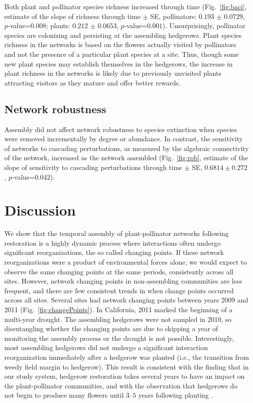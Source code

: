 \documentclass[12pt]{article}
\begin{document}
Both plant and pollinator species richness increased through time
(Fig.~\ref{fig:baci}, estimate of the slope of richness through time
$\pm$ SE, pollinators: $0.193$ $\pm$ $0.0729$, $p$-value=$0.008$;
plants: $0.212$ $\pm$ $0.0653$, $p$-value=$0.001$). Unsurprisingly,
pollinator species are colonizing and persisting at the assembling
hedgerows. Plant species richness in the networks is based on the
flowers actually visited by pollinators and not the presence of a
particular plant species at a site. Thus, though some new plant
species may establish themselves in the hedgerows, the increase in
plant richness in the networks is likely due to previously unvisited
plants attracting visitors as they mature and offer better rewards.

\subsection*{Network robustness}
Assembly did not affect network robustness to species
extinction when species were removed incrementally by
degree %
or abundance. %
In contrast, the sensitivity of networks to cascading perturbations,
as measured by the algebraic connectivity of the network, increased as
the network assembled (Fig.~\ref{fig:rob}, estimate of the slope of
sensitivity to cascading perturbations through time $\pm$ SE, $0.6814
\pm 0.272$, $p$-value=$0.042$).

\section*{Discussion}
\label{sec:discussion}

We show that the temporal assembly of plant-pollinator networks
following restoration is a highly dynamic process where interactions
often undergo significant reorganizations, the so called changing
points. If these network reorganizations were a product of
environmental forces alone, we would expect to observe the same
changing points at the same periods, consistently across all
sites. However, network changing points in non-assembling communities
are less frequent, and there are few consistent trends in when change
points occurred across all sites. Several sites had network changing
points between years 2009 and 2011 (Fig.~\ref{fig:changePoints}). In
California, 2011 marked the beginning of a multi-year drought. The
assembling hedgerows were not sampled in 2010, so disentangling
whether the changing points are due to skipping a year of monitoring
the assembly process or the drought is not possible. Interestingly,
most assembling hedgerows did not undergo a significant interaction
reorganization immediately after a hedgerow was planted (i.e., the
transition from weedy field margin to hedgerow). This result is
consistent with the finding that in our study system, hedgerow
restoration takes several years to have an impact on the
plant-pollinator communities, and with the observation that hedgerows
do not begin to produce many flowers until $3$--$5$ years following
planting \citep{kremen-2015-602}.
\end{document}
